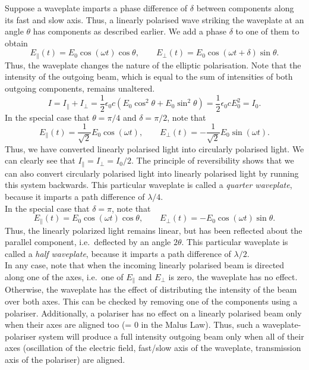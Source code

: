 \documentclass[11pt]{article}
\begin{document}
        Suppose a waveplate imparts a phase difference of $\delta$ between components along its fast and slow axis. Thus, a linearly polarised
        wave striking the waveplate at an angle $\theta$ has components as described earlier. We add a phase $\delta$ to one of them to obtain
        \[
                E_\parallel(t) = E_0\cos(\omega t)\cos\theta, \qquad E_\perp(t) = E_0\cos(\omega t + \delta)\sin\theta.
        \]
        Thus, the waveplate changes the nature of the elliptic polarisation. Note that the intensity of the outgoing beam,
        which is equal to the sum of intensities of both outgoing components, remains unaltered.
        \[
                I = I_\parallel + I_\perp = \frac{1}{2}\epsilon_0c(E_0\cos^2\theta + E_0\sin^2\theta) = \frac{1}{2}\epsilon_0cE_0^2 = I_0.
        \]
        In the special case that $\theta = \pi /4$ and $\delta = \pi /2$, note that
        \[
                E_\parallel(t) = \frac{1}{\sqrt{2}}E_0\cos(\omega t), \qquad E_\perp(t) = -\frac{1}{\sqrt{2}}E_0\sin(\omega t).
        \]
        Thus, we have converted linearly polarised light into circularly polarised light.
        We can clearly see that $I_\parallel = I_\perp = I_0 / 2$. The principle of reversibility shows that
        we can also convert circularly polarised light into linearly polarised light by running this system backwards.
        This particular waveplate is called a \textit{quarter waveplate}, because it imparts a path difference of $\lambda /4$. \\

        In the special case that $\delta = \pi$, note that
        \[
                E_\parallel(t) = E_0\cos(\omega t)\cos\theta, \qquad E_\perp(t) = -E_0\cos(\omega t)\sin\theta.
        \]
        Thus, the linearly polarized light remains linear, but has been reflected about the parallel component, i.e.\ deflected by an angle
        $2\theta$. This particular waveplate is called a \textit{half waveplate}, because it imparts a path difference of $\lambda /2$. \\

        In any case, note that when the incoming linearly polarised beam is directed along one of the axes, i.e.\ one of $E_\parallel$ 
        and $E_\perp$ is zero, the waveplate has no effect. Otherwise, the waveplate has the effect of distributing the intensity
        of the beam over both axes. This can be checked by removing one of the components using a polariser.
        Additionally, a polariser has no effect on a linearly polarised beam only when their axes are aligned too (\theta = 0 in the Malus Law).
        Thus, such a waveplate-polariser system will produce a full intensity outgoing beam only when all of their axes
        (oscillation of the electric field, fast/slow axis of the waveplate, transmission axis of the polariser) are aligned.
\end{document}
